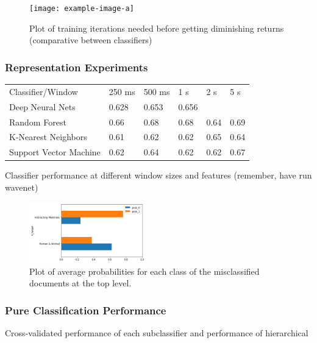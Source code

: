 \begin{figure}
    \centering
    \texttt{[image: example-image-a]}
    \caption{Plot of training iterations needed before getting diminishing returns (comparative between classifiers)}
    \label{fig:learning-curve}
\end{figure}

\subsubsection{Representation Experiments}

\begin{table}[]
    \begin{tabular}{llllll}
    Classifier/Window       & 250 ms & 500 ms & 1 s   & 2 s  & 5 s   \\
    Deep Neural Nets        & 0.628  & 0.653  & 0.656 &      &       \\
    Random Forest           & 0.66   & 0.68   & 0.68  & 0.64 & 0.69  \\
    K-Nearest Neighbors     & 0.61   & 0.62   & 0.62  & 0.65 & 0.64 \\
    Support Vector Machine  & 0.62   & 0.64   & 0.62  & 0.62 & 0.67   
    \end{tabular}
\end{table}

Classifier performance at different window sizes and features (remember, have run wavenet)

\begin{figure}[h]
    \centering
    \includegraphics[width=0.45\textwidth]{figures/knn-prob-plot.png}
    \caption{Plot of average probabilities for each class of the misclassified documents at the top level.}
    \label{fig:a}
\end{figure}

\subsubsection{Pure Classification Performance}

Cross-validated performance of each subclassifier and performance of hierarchical

